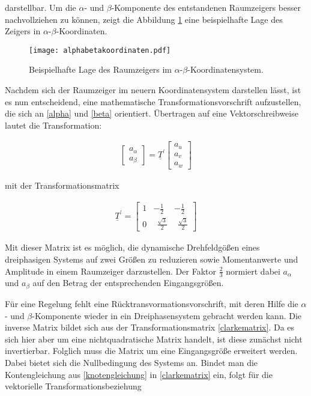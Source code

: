 darstellbar. Um die $\alpha$- und $\beta$-Komponente des entstandenen Raumzeigers besser nachvollziehen zu können, zeigt die Abbildung \ref{fig:alphabetakoordinaten} eine beispielhafte Lage des Zeigers in $\alpha$-$\beta$-Koordinaten.

\begin{figure}[h]
	\centering
	\texttt{[image: alphabetakoordinaten.pdf]}
	\label{fig:alphabetakoordinaten}
	\caption{Beispielhafte Lage des Raumzeigers im $\alpha$-$\beta$-Koordinatensystem.}
\end{figure}

Nachdem sich der Raumzeiger im neuern Koordinatensystem darstellen lässt, ist es nun entscheidend, eine mathematische Transformationsvorschrift aufzustellen, die sich an \ref{alpha} und \ref{beta} orientiert. 
Übertragen auf eine Vektorschreibweise lautet die Transformation:

\begin{align}
	\begin{bmatrix}
	a_{\alpha} \\
	a_{\beta} 
	\end{bmatrix}
	=\underline{T}^{\prime}
	\begin{bmatrix}
	a_{u} \\
	a_{v} \\
	a_{w}
	\end{bmatrix}
	\label{clarkevektor}
\end{align}

mit der Transformationsmatrix

\begin{align}
	\underline{T}^{\prime} = 
	\begin{bmatrix}
		1 & -\frac{1}{2} & -\frac{1}{2}  \\
		0 & ~~\frac{\sqrt{3}}{2} & ~~\frac{\sqrt{3}}{2}
	\end{bmatrix}
	\label{clarkematrix}
\end{align}

Mit dieser Matrix ist es möglich, die dynamische Drehfeldgößen eines dreiphasigen Systems auf zwei Größen zu reduzieren sowie Momentanwerte und Amplitude in einem Raumzeiger darzustellen.
Der Faktor $\frac{2}{3}$ normiert dabei $a_{\alpha}$ und $a_{\beta}$ auf den Betrag der entsprechenden Eingangsgrößen.

Für eine Regelung fehlt eine Rücktransvormationsvorschrift, mit deren Hilfe die $\alpha$- und $\beta$-Komponente wieder in ein Dreiphasensystem gebracht werden kann.
Die inverse Matrix bildet sich aus der Transformationsmatrix \ref{clarkematrix}. 
Da es sich hier aber um eine nichtquadratische Matrix handelt, ist diese zunächst nicht invertierbar.
Folglich muss die Matrix um eine Eingangsgröße erweitert werden.
Dabei bietet sich die Nullbedingung des Systems an.
Bindet man die Kontengleichung aus \ref{knotengleichung} in \ref{clarkematrix} ein, folgt für die vektorielle Transformationsbeziehung

